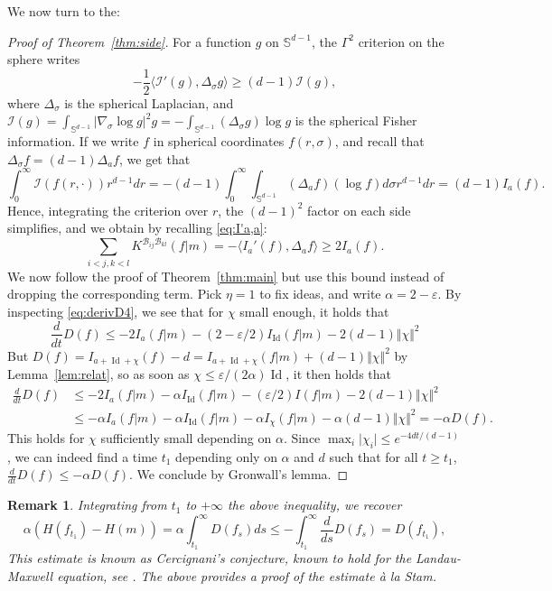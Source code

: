 \documentclass[11pt,a4paper]{article}
\theoremstyle{definition}
\theoremstyle{plain}
\newtheorem{remark}[defi]{Remark}
\DeclareMathOperator*{\Id}{Id}
\newcommand{\jap}[1]{\langle #1 \rangle}
\begin{document}
We now turn to the:
\begin{proof}[Proof of Theorem~\ref{thm:side}]
    For a function $g$ on $\mathbb{S}^{d-1}$, the $\Gamma^2$ criterion on the sphere \cite{BakryGentilLedoux2014} writes
$$-\frac{1}{2}\jap{\mathcal{I}'(g),\Delta_\sigma g}\geq (d-1)\mathcal{I}(g),$$
where $\Delta_\sigma$ is the spherical Laplacian, and $\mathcal{I}(g) = \int_{\mathbb{S}^{d-1}} \vert \nabla_\sigma \log g\vert^2 g=-\int_{\mathbb{S}^{d-1}} (\Delta_\sigma g)\log g$ is the spherical Fisher information. If we write $f$ in spherical coordinates $f(r,\sigma)$, and recall that $\Delta_\sigma f= (d-1)\Delta_a f$, we get that
$$\int_0^\infty \mathcal{I}(f(r,\cdot))r^{d-1}dr=-(d-1)\int_0^\infty \int_{\mathbb{S}^{d-1}} (\Delta_a f)(\log f) d\sigma r^{d-1}dr=(d-1)I_a(f).$$
Hence, integrating the criterion over $r$, the $(d-1)^2$ factor on each side simplifies, and we obtain by recalling \eqref{eq:I'a,a}:
$$\sum_{i<j,k<l}K^{ \mathcal{B}_{ij}\mathcal{B}_{kl}}(f\vert m)= -\jap{I_a'(f),\Delta_a f}\geq 2I_a(f).$$
We now follow the proof of Theorem~\ref{thm:main} but use this bound instead of dropping the corresponding term. Pick $\eta=1$ to fix ideas, and write $\alpha=2-\varepsilon$. By inspecting \eqref{eq:derivD4}, we see that for $\chi$ small enough, it holds that
$$\frac{d}{dt}D(f)\leq -2I_a(f\vert m)-(2-\varepsilon/2) I_{\Id}(f\vert m)-2(d-1)\Vert \chi\Vert^2$$
But $D(f)=I_{a+\Id+\chi}(f)-d=I_{a+\Id+\chi}(f\vert m)+(d-1)\Vert \chi\Vert^2$ by Lemma~\ref{lem:relat}, so
as soon as $\chi\leq \varepsilon/(2\alpha)\Id$, it then holds that
    \begin{align*}
        \frac{d}{dt}D(f)&\leq -2I_a(f\vert m)-\alpha I_{\Id }(f\vert m)-(\varepsilon/2)I(f\vert m)-2(d-1)\Vert \chi\Vert^2\\
        &\leq -\alpha I_a(f\vert m)-\alpha I_{\Id }(f\vert m)-\alpha I_\chi(f\vert m)-\alpha(d-1)\Vert \chi\Vert^2=-\alpha D(f).
    \end{align*}
This holds for $\chi$ sufficiently small depending on $\alpha$. Since $\max_i\vert\chi_i\vert\leq e^{-4dt/(d-1)}$, we can indeed find a time $t_1$ depending only on $\alpha$ and $d$ such that for all $t\geq t_1$, $\frac{d}{dt}D(f)\leq -\alpha D(f)$. We conclude by Gronwall's lemma.
\end{proof}
\begin{remark}
    Integrating from $t_1$ to $+\infty$ the above inequality, we recover
    $$\alpha(H(f_{t_1})-H(m))=\alpha\int_{t_1}^\infty D(f_s)ds \leq -\int_{t_1}^\infty \frac{d}{ds}D(f_s)=D(f_{t_1}),$$
    This estimate is known as Cercignani's conjecture, known to hold for the Landau-Maxwell equation, see \cite{DesvillettesVillani2000}. The above provides a proof of the estimate \emph{à la} Stam.
\end{remark}
\end{document}
